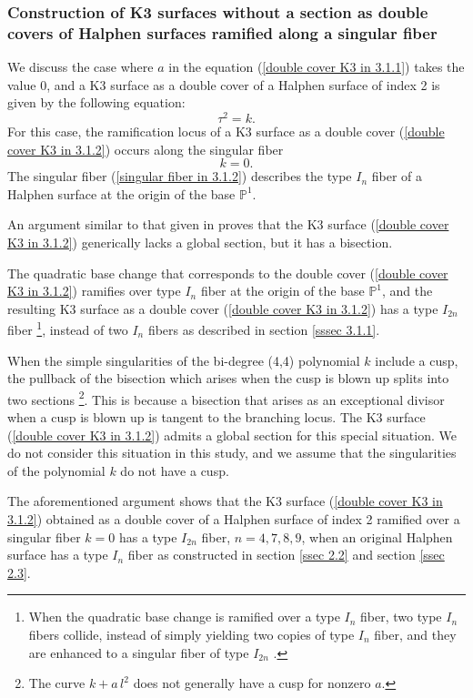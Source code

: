 \documentclass[12pt]{article}
\def\P{\mathbb{P}}
\begin{document}
\subsubsection{Construction of K3 surfaces without a section as double covers of Halphen surfaces ramified along a singular fiber}
\label{sssec 3.1.2}
We discuss the case where $a$ in the equation (\ref{double cover K3 in 3.1.1}) takes the value 0, and a K3 surface as a double cover of a Halphen surface of index 2 is given by the following equation:
\begin{equation}
\label{double cover K3 in 3.1.2}
\tau^2 = k.
\end{equation}
For this case, the ramification locus of a K3 surface as a double cover (\ref{double cover K3 in 3.1.2}) occurs along the singular fiber
\begin{equation}
\label{singular fiber in 3.1.2}
k=0.
\end{equation}
The singular fiber (\ref{singular fiber in 3.1.2}) describes the type $I_n$ fiber of a Halphen surface at the origin of the base $\P^1$. 
\par An argument similar to that given in \cite{Kimura1801} proves that the K3 surface (\ref{double cover K3 in 3.1.2}) generically lacks a global section, but it has a bisection. 
\par The quadratic base change that corresponds to the double cover (\ref{double cover K3 in 3.1.2}) ramifies over type $I_n$ fiber at the origin of the base $\P^1$, and the resulting K3 surface as a double cover (\ref{double cover K3 in 3.1.2}) has a type $I_{2n}$ fiber \footnote{When the quadratic base change is ramified over a type $I_n$ fiber, two type $I_n$ fibers collide, instead of simply yielding two copies of type $I_n$ fiber, and they are enhanced to a singular fiber of type $I_{2n}$ \cite{SchShio}.}, instead of two $I_n$ fibers as described in section \ref{sssec 3.1.1}. 
\par When the simple singularities of the bi-degree (4,4) polynomial $k$ include a cusp, the pullback of the bisection which arises when the cusp is blown up splits into two sections \footnote{The curve $k+a\, l^2$ does not generally have a cusp for nonzero $a$.}. This is because a bisection that arises as an exceptional divisor when a cusp is blown up is tangent to the branching locus. The K3 surface (\ref{double cover K3 in 3.1.2}) admits a global section for this special situation. We do not consider this situation in this study, and we assume that the singularities of the polynomial $k$ do not have a cusp. 
\par The aforementioned argument shows that the K3 surface (\ref{double cover K3 in 3.1.2}) obtained as a double cover of a Halphen surface of index 2 ramified over a singular fiber $k=0$ has a type $I_{2n}$ fiber, $n=4,7,8,9$, when an original Halphen surface has a type $I_n$ fiber as constructed in section \ref{ssec 2.2} and section \ref{ssec 2.3}.
\end{document}
